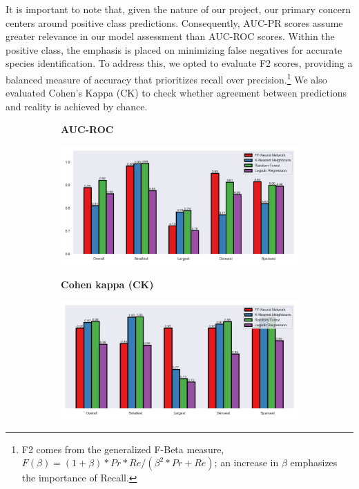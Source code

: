 It is important to note that, given the nature of our project, our primary concern centers around positive class predictions. Consequently, AUC-PR scores assume greater relevance in our model assessment than AUC-ROC scores. Within the positive class, the emphasis is placed on minimizing false negatives for accurate species identification. To address this, we opted to evaluate F2 scores, providing a balanced measure of accuracy that prioritizes recall over precision.\footnote{F2 comes from the generalized F-Beta measure, $F(\beta)=(1+\beta)*Pr*Re/(\beta^2*Pr+Re)$; an increase in $\beta$ emphasizes the importance of Recall.}\cite{sasaki2007truth} We also evaluated Cohen’s Kappa (CK) to check whether agreement between predictions and reality is achieved by chance.\cite{warrens2015five}


\begin{figure}[hbt!] 
\centering


\begin{subfigure}{.45\linewidth}
\vspace*{-1ex}  
\begin{center}
\textbf{AUC-ROC}
\end{center}
\vspace*{-1ex}
  \includegraphics[width=\linewidth]{Images/AUC_ROC.png}
\end{subfigure}
  \hspace*{-1em}
\begin{subfigure}{.45\linewidth}
\vspace*{-1ex}  
\begin{center}
\textbf{Cohen kappa (CK)}
\end{center}
\vspace*{-1ex}
  \includegraphics[width=\linewidth]{Images/Cohen_Kappa.png}
\end{subfigure}


\end{figure}
